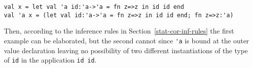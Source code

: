 \begin{verbatim}
val x = let val 'a id:'a->'a = fn z=>z in id id end
val 'a x = (let val id:'a->'a = fn z=>z in id id end; fn z=>z:'a)
\end{verbatim}

Then, according to the inference rules in Section~\ref{stat-cor-inf-rules} the first example can be elaborated, but the second cannot since
\verb+'a+ is bound at the outer value declaration leaving no possibility of two different instantiations of the type of
\verb+id+ in the application \verb+id id+.

